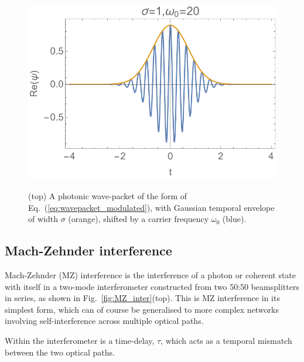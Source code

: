 \begin{figure}[!htb]
	\includegraphics[width=\columnwidth]{wavepacket} \\
	\caption{(top) A photonic wave-packet of the form of Eq.~(\ref{eq:wavepacket_modulated}), with Gaussian temporal envelope of width $\sigma$ (orange), shifted by a carrier frequency $\omega_0$ (blue).} \label{fig:HOM_vs_MZ}
\end{figure}

%
%

\subsection{Mach-Zehnder interference}  \label{sec:MZ_inter}

Mach-Zehnder (MZ) interference is the interference of a photon or coherent state with itself in a two-mode interferometer constructed from two 50:50 beamsplitters in series, as shown in Fig.~\ref{fig:MZ_inter}(top). This is MZ interference in its simplest form, which can of course be generalised to more complex networks involving self-interference across multiple optical paths.

Within the interferometer is a time-delay, $\tau$, which acts as a temporal mismatch between the two optical paths. 

